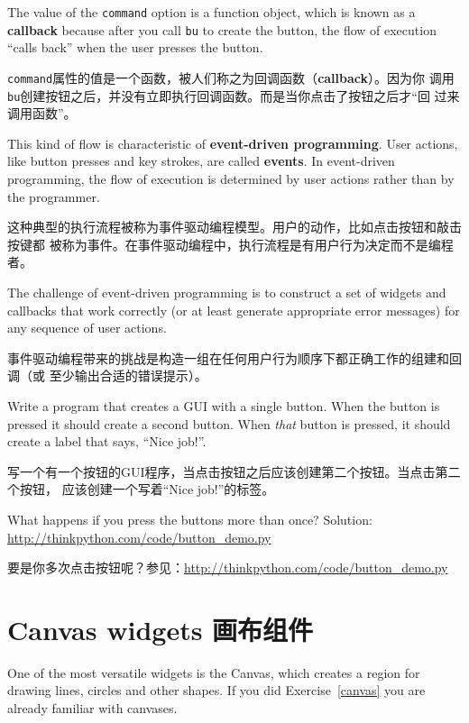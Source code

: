 \documentclass[10pt]{book}
\begin{document}
\begin{CJK}{UTF8}{gbsn}
The value of the {\tt command} option
is a function object, which is known as a {\bf callback} because
after you call {\tt bu} to create the button, the flow of execution
``calls back'' when the user presses the button.

{\tt command}属性的值是一个函数，被人们称之为回调函数（{\bf callback}）。因为你
调用{\tt bu}创建按钮之后，并没有立即执行回调函数。而是当你点击了按钮之后才``回
过来调用函数''。

This kind of flow is characteristic of {\bf event-driven programming}.
User actions, like button presses and key strokes, are called {\bf
events}.  In event-driven programming, the flow of execution is
determined by user actions rather than by the programmer.  

这种典型的执行流程被称为事件驱动编程模型。用户的动作，比如点击按钮和敲击按键都
被称为事件。在事件驱动编程中，执行流程是有用户行为决定而不是编程者。

The challenge of event-driven programming is to construct a set of
widgets and callbacks that work correctly (or at least generate
appropriate error messages) for any sequence of user actions.

事件驱动编程带来的挑战是构造一组在任何用户行为顺序下都正确工作的组建和回调（或
至少输出合适的错误提示）。

\begin{exercise}

Write a program that creates a GUI with a single button.  When the
button is pressed it should create a second button.  When
{\em that} button is pressed, it should create a label that
says, ``Nice job!''.

写一个有一个按钮的GUI程序，当点击按钮之后应该创建第二个按钮。当点击第二个按钮，
应该创建一个写着``Nice job!''的标签。

What happens if you press the buttons more than once?
Solution: \url{http://thinkpython.com/code/button_demo.py}

要是你多次点击按钮呢？参见：\url{http://thinkpython.com/code/button_demo.py}

\end{exercise}


\section{Canvas widgets 画布组件}

One of the most versatile widgets is the Canvas, which creates
a region for drawing lines, circles and other shapes.  If you
did Exercise~\ref{canvas} you are already familiar with canvases.


\end{CJK}
\end{document}
